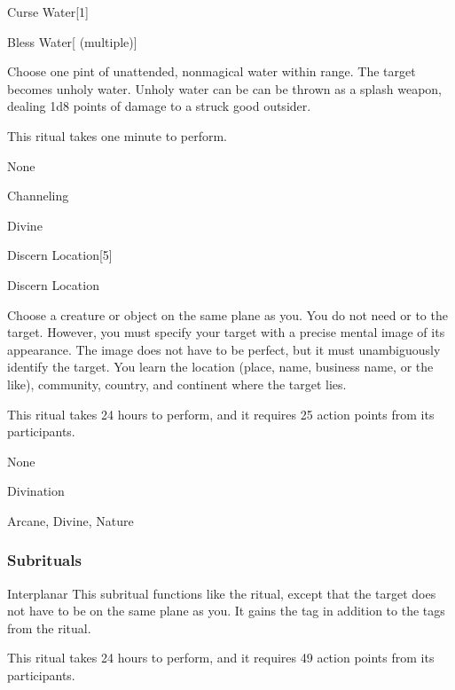 \begin{spellsection}{Curse Water}[1]


\begin{ability}{Bless Water}[ (multiple)]

Choose one pint of unattended, nonmagical water within \rngclose range.
The target becomes unholy water.
Unholy water can be can be thrown as a splash weapon, dealing 1d8 points of damage to a struck good outsider.

This ritual takes one minute to perform.

\end{ability}


 None

 Channeling

 Divine
\end{spellsection}


\begin{spellsection}{Discern Location}[5]


\begin{ability}{Discern Location}

Choose a creature or object on the same plane as you.
You do not need  or  to the target.
However, you must specify your target with a precise mental image of its appearance.
The image does not have to be perfect, but it must unambiguously identify the target.
You learn the location (place, name, business name, or the like), community, country, and continent where the target lies.

This ritual takes 24 hours to perform, and it requires 25 action points from its participants.

\end{ability}


 None

 Divination

 Arcane, Divine, Nature
\end{spellsection}


\subsubsection{Subrituals}


\begin{ability}[\nth{7}]{Interplanar}
This subritual functions like the  ritual, except that the target does not have to be on the same plane as you.
It gains the  tag in addition to the tags from the  ritual.

This ritual takes 24 hours to perform, and it requires 49 action points from its participants.
\end{ability}
\vspace{0.25em}


